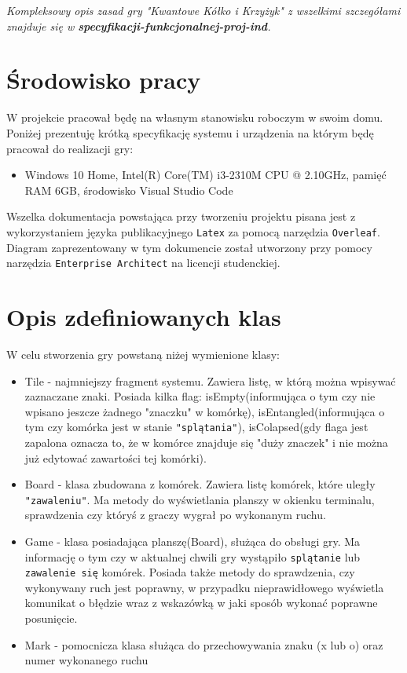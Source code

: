 \documentclass{article}
\begin{document}
\begin{flushleft}\emph{Kompleksowy opis zasad gry "Kwantowe Kółko i Krzyżyk" z wszelkimi szczegółami znajduje się w \textbf{specyfikacji-funkcjonalnej-proj-ind}.} \end{flushleft}

\section{Środowisko pracy}
W projekcie pracował będę na własnym stanowisku roboczym w swoim domu. Poniżej prezentuję krótką specyfikację systemu i urządzenia na którym będę pracował do realizacji gry:\\
\begin{itemize}
    \item Windows 10 Home, Intel(R) Core(TM) i3-2310M CPU @ 2.10GHz, pamięć RAM 6GB, środowisko Visual Studio Code 
\end{itemize}

Wszelka dokumentacja powstająca przy tworzeniu projektu pisana jest z wykorzystaniem języka publikacyjnego \texttt{Latex} za pomocą narzędzia \texttt{Overleaf}.\\
Diagram zaprezentowany w tym dokumencie został utworzony przy pomocy narzędzia \texttt{Enterprise Architect} na licencji studenckiej.

\newpage

\section{Opis zdefiniowanych klas}
W celu stworzenia gry powstaną niżej wymienione klasy:
\begin{itemize}
    \item Tile - najmniejszy fragment systemu. Zawiera listę, w którą można wpisywać zaznaczane znaki. Posiada kilka flag: isEmpty(informująca o tym czy nie wpisano jeszcze żadnego "znaczku" w komórkę), isEntangled(informująca o tym czy komórka jest w stanie \texttt{"splątania"}), isColapsed(gdy flaga jest zapalona oznacza to, że w komórce znajduje się "duży znaczek" i nie można już edytować zawartości tej komórki).
    \item Board - klasa zbudowana z komórek. Zawiera listę komórek, które uległy \texttt{"zawaleniu"}. Ma metody do wyświetlania planszy w okienku terminalu, sprawdzenia czy któryś z graczy wygrał po wykonanym ruchu.
    \item Game - klasa posiadająca planszę(Board), służąca do obsługi gry. Ma informację o tym czy w aktualnej chwili gry wystąpiło \texttt{splątanie} lub \texttt{zawalenie się} komórek. Posiada także metody do sprawdzenia, czy wykonywany ruch jest poprawny, w przypadku nieprawidłowego wyświetla komunikat o błędzie wraz z wskazówką w jaki sposób wykonać poprawne posunięcie.
    \item Mark - pomocnicza klasa służąca do przechowywania znaku (x lub o) oraz numer wykonanego ruchu
\end{itemize}
\end{document}
